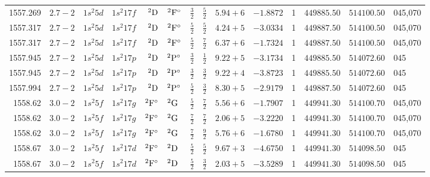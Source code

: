 \begin{table}
\begin{tabular}{rrr@{ -- }lr@{ -- }lr@{ -- }llrrr@{ -- }rl}
   1557.269\phantom{0000000} & $2.7-2$ &  $1s^{2}5d$ & $1s^{2}17f$ &       $^{2}{\rm D}$ & $^{2}{\rm F}^\circ$ &  $\frac{3}{2}$ & $\frac{5}{2}$  & $5.94+6$ & $ -1.8872$ &     1 & $449885.50$ & $514100.50$ & 045,070 \\
   1557.317\phantom{0000000} & $2.7-2$ &  $1s^{2}5d$ & $1s^{2}17f$ &       $^{2}{\rm D}$ & $^{2}{\rm F}^\circ$ &  $\frac{5}{2}$ & $\frac{5}{2}$  & $4.24+5$ & $ -3.0334$ &     1 & $449887.50$ & $514100.50$ & 045,070 \\
   1557.317\phantom{0000000} & $2.7-2$ &  $1s^{2}5d$ & $1s^{2}17f$ &       $^{2}{\rm D}$ & $^{2}{\rm F}^\circ$ &  $\frac{5}{2}$ & $\frac{7}{2}$  & $6.37+6$ & $ -1.7324$ &     1 & $449887.50$ & $514100.50$ & 045,070 \\
   1557.945\phantom{0000000} & $2.7-2$ &  $1s^{2}5d$ & $1s^{2}17p$ &       $^{2}{\rm D}$ & $^{2}{\rm P}^\circ$ &  $\frac{3}{2}$ & $\frac{1}{2}$  & $9.22+5$ & $ -3.1734$ &     1 & $449885.50$ & $514072.60$ & 045 \\
   1557.945\phantom{0000000} & $2.7-2$ &  $1s^{2}5d$ & $1s^{2}17p$ &       $^{2}{\rm D}$ & $^{2}{\rm P}^\circ$ &  $\frac{3}{2}$ & $\frac{3}{2}$  & $9.22+4$ & $ -3.8723$ &     1 & $449885.50$ & $514072.60$ & 045 \\
   1557.994\phantom{0000000} & $2.7-2$ &  $1s^{2}5d$ & $1s^{2}17p$ &       $^{2}{\rm D}$ & $^{2}{\rm P}^\circ$ &  $\frac{5}{2}$ & $\frac{3}{2}$  & $8.30+5$ & $ -2.9179$ &     1 & $449887.50$ & $514072.60$ & 045 \\
   1558.62\phantom{00000000} & $3.0-2$ &  $1s^{2}5f$ & $1s^{2}17g$ & $^{2}{\rm F}^\circ$ & $^{2}{\rm G}$       &  $\frac{5}{2}$ & $\frac{7}{2}$  & $5.56+6$ & $ -1.7907$ &     1 & $449941.30$ & $514100.70$ & 045,070 \\
   1558.62\phantom{00000000} & $3.0-2$ &  $1s^{2}5f$ & $1s^{2}17g$ & $^{2}{\rm F}^\circ$ & $^{2}{\rm G}$       &  $\frac{7}{2}$ & $\frac{7}{2}$  & $2.06+5$ & $ -3.2220$ &     1 & $449941.30$ & $514100.70$ & 045,070 \\
   1558.62\phantom{00000000} & $3.0-2$ &  $1s^{2}5f$ & $1s^{2}17g$ & $^{2}{\rm F}^\circ$ & $^{2}{\rm G}$       &  $\frac{7}{2}$ & $\frac{9}{2}$  & $5.76+6$ & $ -1.6780$ &     1 & $449941.30$ & $514100.70$ & 045,070 \\
   1558.67\phantom{00000000} & $3.0-2$ &  $1s^{2}5f$ & $1s^{2}17d$ & $^{2}{\rm F}^\circ$ & $^{2}{\rm D}$       &  $\frac{5}{2}$ & $\frac{5}{2}$  & $9.67+3$ & $ -4.6750$ &     1 & $449941.30$ & $514098.50$ & 045 \\
   1558.67\phantom{00000000} & $3.0-2$ &  $1s^{2}5f$ & $1s^{2}17d$ & $^{2}{\rm F}^\circ$ & $^{2}{\rm D}$       &  $\frac{5}{2}$ & $\frac{3}{2}$  & $2.03+5$ & $ -3.5289$ &     1 & $449941.30$ & $514098.50$ & 045 \\

\end{tabular}
\end{table}
